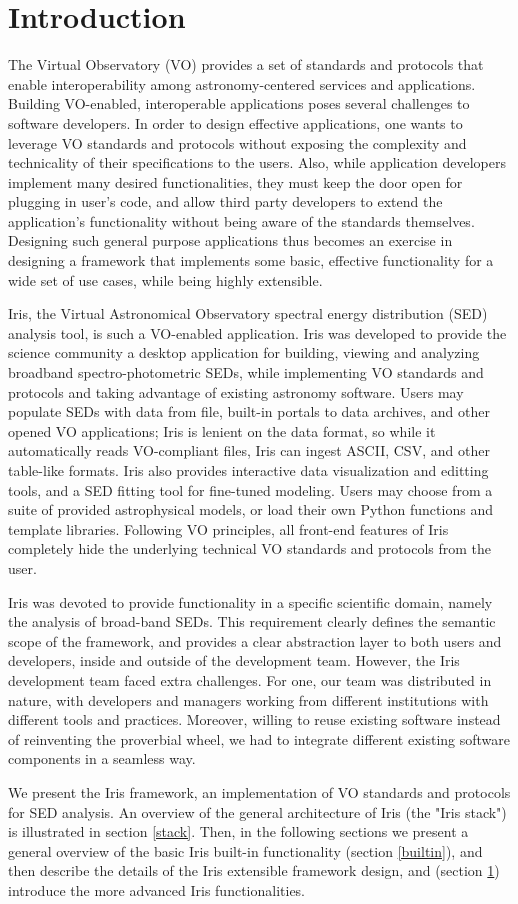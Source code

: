 \section{Introduction} 
The Virtual Observatory (VO) provides a set of standards and protocols that enable interoperability among astronomy-centered services and applications. Building VO-enabled, interoperable applications poses several challenges to software developers. In order to design effective applications, one wants to leverage VO standards and protocols without exposing the complexity and technicality of their specifications to the users. Also, while application developers implement many desired functionalities, they must keep the door open for plugging in user's code, and allow third party developers to extend the application's functionality without being aware of the standards themselves. Designing such general purpose applications thus becomes an exercise in designing a framework that implements some basic, effective functionality for a wide set of use cases, while being highly extensible.

Iris, the Virtual Astronomical Observatory spectral energy distribution (SED) analysis tool, is such a VO-enabled application. Iris was developed to provide the science community a desktop application for building, viewing and analyzing broadband spectro-photometric SEDs, while implementing VO standards and protocols and taking advantage of existing astronomy software. Users may populate SEDs with data from file, built-in portals to data archives, and other opened VO applications; Iris is lenient on the data format, so while it automatically reads VO-compliant files, Iris can ingest ASCII, CSV, and other table-like formats. Iris also provides interactive data visualization and editting tools, and a SED fitting tool for fine-tuned modeling. Users may choose from a suite of provided astrophysical models, or load their own Python functions and template libraries. Following VO principles, all front-end features of Iris completely hide the underlying technical VO standards and protocols from the user.

Iris was devoted to provide functionality in a specific scientific domain, namely the analysis of broad-band SEDs. This requirement clearly defines the semantic scope of the framework, and provides a clear abstraction layer to both users and developers, inside and outside of the development team. However, the Iris development team faced extra challenges. For one, our team was distributed in nature, with developers and managers working from different institutions with different tools and practices. Moreover, willing to reuse existing software instead of reinventing the proverbial wheel, we had to integrate different existing software components in a seamless way.

We present the Iris framework, an implementation of VO standards and protocols for SED analysis. An overview of the general architecture of Iris (the "Iris stack") is illustrated in section \ref{stack}. Then, in the following sections we present a general overview of the basic Iris built-in functionality (section \ref{builtin}), and then describe the details of the Iris extensible framework design, and (section \ref{}) introduce the more advanced Iris functionalities.